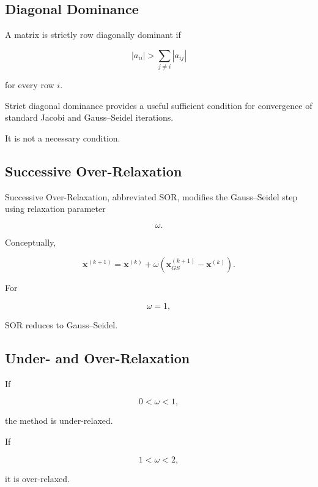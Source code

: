 \subsection{Diagonal Dominance}
\label{subsec:diagonal-dominance}

A matrix is strictly row diagonally dominant if

\[
\boxed{
|a_{ii}|
>
\sum_{j\neq i}
|a_{ij}|
}
\]

for every row \(i\).

Strict diagonal dominance provides a useful sufficient condition for
convergence of standard Jacobi and Gauss--Seidel iterations.

It is not a necessary condition.

\subsection{Successive Over-Relaxation}
\label{subsec:successive-over-relaxation}

Successive Over-Relaxation, abbreviated SOR, modifies the Gauss--Seidel
step using relaxation parameter

\[
\boxed{
\omega.
}
\]

Conceptually,

\[
\boxed{
\mathbf{x}^{(k+1)}
=
\mathbf{x}^{(k)}
+
\omega
\left(
\mathbf{x}_{GS}^{(k+1)}
-
\mathbf{x}^{(k)}
\right).
}
\]

For

\[
\omega=1,
\]

SOR reduces to Gauss--Seidel.

\subsection{Under- and Over-Relaxation}
\label{subsec:under-over-relaxation}

If

\[
0<\omega<1,
\]

the method is under-relaxed.

If

\[
1<\omega<2,
\]

it is over-relaxed.

